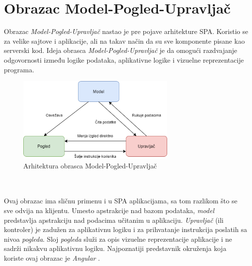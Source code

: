 \documentclass[12pt,oneside]{memoir}
\begin{document}
\section{Obrazac Model-Pogled-Upravljač}

Obrazac \emph{Model-Pogled-Upravljač} nastao je pre pojave arhitekture SPA.
Koristio se za velike sajtove i aplikacije, ali na takav način da su sve komponente pisane
kao serverski kod. Ideja obrasca \emph{Model-Pogled-Upravljač} je da omogući razdvajanje odgovornosti
između logike podataka, aplikativne logike i vizuelne reprezentacije programa.
\begin{figure}[!ht]
  \centering
  \includegraphics[width=0.7\textwidth]{slike/MVC_pattern.drawio.png}
  \caption{Arhitektura obrasca Model-Pogled-Upravljač}
  \label{fig:MVC}
\end{figure}
\\
\\
Ovaj obrazac ima sličnu primenu i u SPA aplikacijama, sa tom razlikom što se sve odvija na klijentu.
Umesto apstrakcije nad bazom podataka, \emph{model} predstavlja apstrakciju nad podacima učitanim
u aplikaciju. \emph{Upravljač} (ili kontroler) je zadužen za aplikativnu logiku i za prihvatanje
instrukcija poslatih sa nivoa \emph{pogleda}. Sloj \emph{pogleda} služi za opis vizuelne
reprezentacije aplikacije i ne sadrži nikakvu aplikativnu logiku. Najpoznatiji predstavnik okruženja
koja koriste ovaj obrazac je \emph{Angular} \cite{Angular}.
\end{document}
